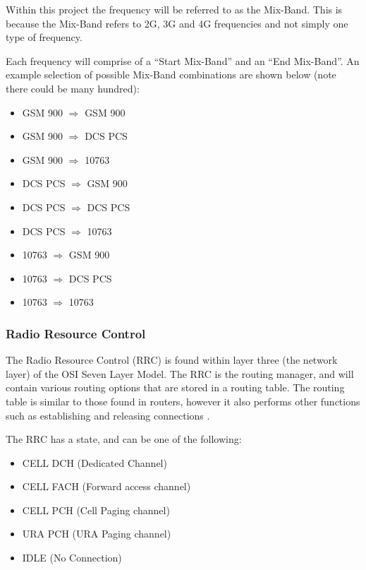 Within this project the frequency will be referred to as the Mix-Band. This is 
because the Mix-Band refers to 2G, 3G and 4G frequencies and not simply one 
type of frequency. 

Each frequency will comprise of a ``Start Mix-Band'' and an ``End Mix-Band''. 
An example selection of possible Mix-Band combinations are shown below (note 
there could be many hundred):

\begin{multicols}{3}
  \begin{itemize}
    \item GSM 900 $\Rightarrow$ GSM 900
    \item GSM 900 $\Rightarrow$ DCS PCS
    \item GSM 900 $\Rightarrow$ 10763
    \item DCS PCS $\Rightarrow$ GSM 900
    \item DCS PCS $\Rightarrow$ DCS PCS
    \item DCS PCS $\Rightarrow$ 10763
    \item 10763 $\Rightarrow$ GSM 900
    \item 10763 $\Rightarrow$ DCS PCS
    \item 10763 $\Rightarrow$ 10763
  \end{itemize}
\end{multicols}


\subsubsection{Radio Resource Control}
The Radio Resource Control (RRC) is found within layer three (the network 
layer) of the OSI Seven Layer Model. The RRC is the routing manager, and will 
contain various routing options that are stored in a routing table. 
The routing table is similar to those found in routers, however it also 
performs other functions such as establishing and releasing connections 
\citep{mpirical10}.

The RRC has a state, and can be one of the following:
\begin{itemize}
  \item CELL DCH (Dedicated Channel)
  \item CELL FACH (Forward access channel)
  \item CELL PCH (Cell Paging channel) 
  \item URA PCH (URA Paging channel)
  \item IDLE (No Connection)
\end{itemize}


